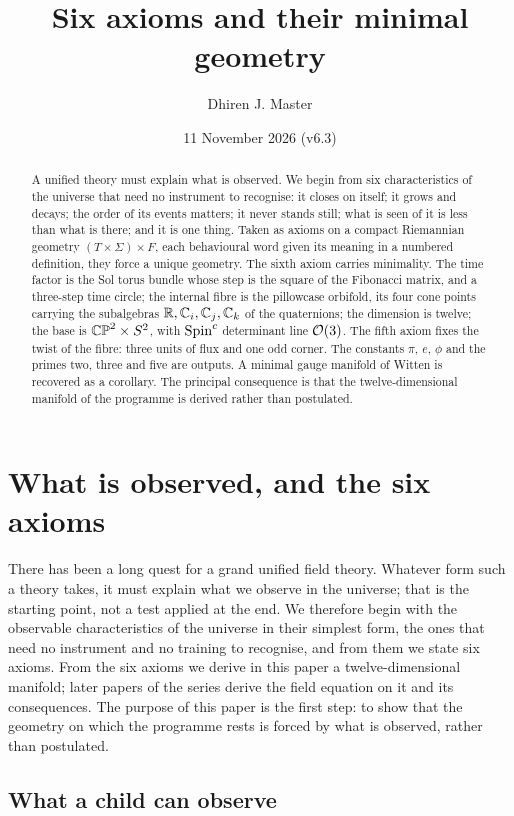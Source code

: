 \documentclass[11pt,a4paper]{article}
\title{Six axioms and their minimal geometry}
\author{Dhiren J. Master}
\date{11 November 2026 (v6.3)}
\theoremstyle{plain}
\theoremstyle{definition}
\theoremstyle{remark}
\begin{document}
\maketitle

\begin{abstract}
A unified theory must explain what is observed. We begin from six characteristics of the universe that need no instrument to recognise: it closes on itself; it grows and decays; the order of its events matters; it never stands still; what is seen of it is less than what is there; and it is one thing. Taken as axioms on a compact Riemannian geometry $(T\times\Sigma)\times F$, each behavioural word given its meaning in a numbered definition, they force a unique geometry. The sixth axiom carries minimality. The time factor is the Sol torus bundle whose step is the square of the Fibonacci matrix, and a three-step time circle; the internal fibre is the pillowcase orbifold, its four cone points carrying the subalgebras $\mathbb{R},\mathbb{C}_i,\mathbb{C}_j,\mathbb{C}_k$ of the quaternions; the dimension is twelve; the base is $\mathbb{CP}^2\times S^2$, with $\text{Spin}^c$ determinant line $\mathcal{O}(3)$. The fifth axiom fixes the twist of the fibre: three units of flux and one odd corner. The constants $\pi$, $e$, $\phi$ and the primes two, three and five are outputs. A minimal gauge manifold of Witten is recovered as a corollary. The principal consequence is that the twelve-dimensional manifold of the programme is derived rather than postulated.
\end{abstract}

\section{What is observed, and the six axioms}\label{sec:intro}

There has been a long quest for a grand unified field theory. Whatever form such a theory takes, it must explain what we observe in the universe; that is the starting point, not a test applied at the end. We therefore begin with the observable characteristics of the universe in their simplest form, the ones that need no instrument and no training to recognise, and from them we state six axioms. From the six axioms we derive in this paper a twelve-dimensional manifold; later papers of the series derive the field equation on it and its consequences. The purpose of this paper is the first step: to show that the geometry on which the programme rests is forced by what is observed, rather than postulated.

\subsection{What a child can observe}\label{sec:observe}
\end{document}

